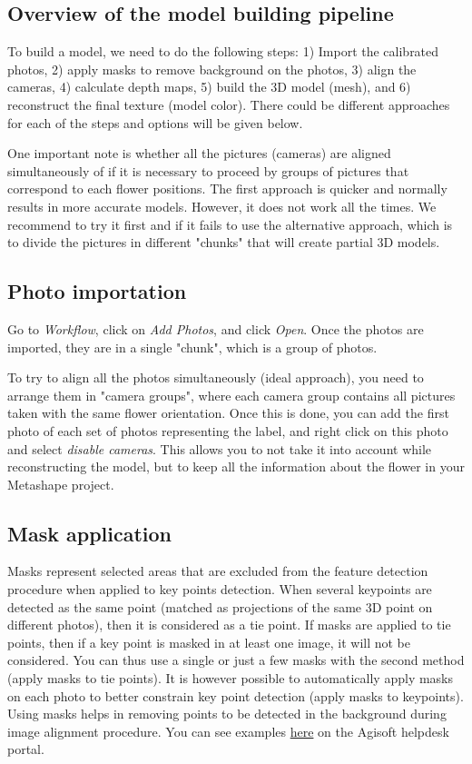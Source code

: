 \documentclass[10pt,letter,english]{article}
\begin{document}
\subsection{Overview of the model building pipeline}

To build a model, we need to do the following steps: 1) Import the calibrated photos, 2) apply masks to remove background on the photos, 3) align the cameras, 4) calculate depth maps, 5) build the 3D model (mesh), and 6) reconstruct the final texture (model color). There could be different approaches for each of the steps and options will be given below.

One important note is whether all the pictures (cameras) are aligned simultaneously of if it is necessary to proceed by groups of pictures that correspond to each flower positions. The first approach is quicker and normally results in more accurate models. However, it does not work all the times. We recommend to try it first and if it fails to use the alternative approach, which is to divide the pictures in different "chunks" that will create partial 3D models.


\subsection{Photo importation}

Go to \textit{Workflow}, click on \textit{Add Photos}, and click \textit{Open}. Once the photos are imported, they are in a single "chunk", which is a group of photos.

To try to align all the photos simultaneously (ideal approach), you need to arrange them in "camera groups", where each camera group contains all pictures taken with the same flower orientation. Once this is done, you can add the first photo of each set of photos representing the label, and right click on this photo and select \textit{disable cameras}. This allows you to not take it into account while reconstructing the model, but to keep all the information about the flower in your Metashape project.


\subsection{Mask application}

Masks represent selected areas that are excluded from the feature detection procedure when applied to key points detection. When several keypoints are detected as the same point (matched as projections of the same 3D point on different photos), then it is considered as a tie point. If masks are applied to tie points, then if a key point is masked in at least one image, it will not be considered. You can thus use a single or just a few masks with the second method (apply masks to tie points). It is however possible to automatically apply masks on each photo to better constrain key point detection (apply masks to keypoints). Using masks helps in removing points to be detected in the background during image alignment procedure.
You can see examples \href{https://agisoft.freshdesk.com/support/solutions/articles/31000158967-aligning-turntable-photos-with-background-suppression-from-single-mask-in-agisoft-metashape}{here} on the Agisoft helpdesk portal.
\end{document}
